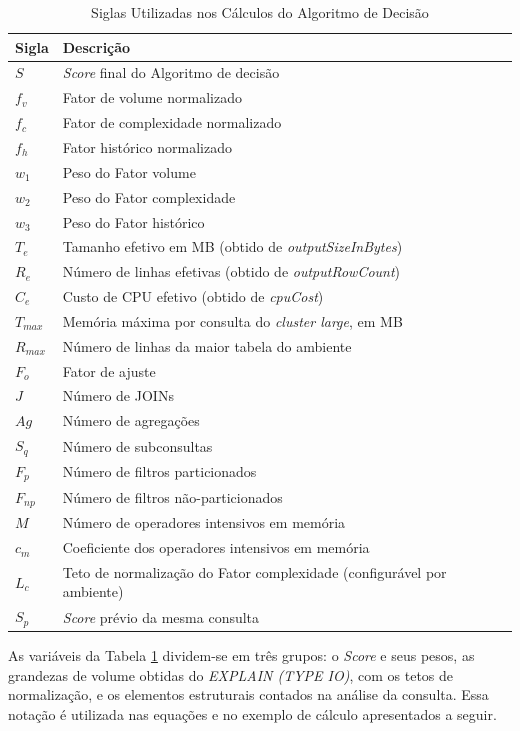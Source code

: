 \begin{table}[H]
	\centering
	\caption{Siglas Utilizadas nos Cálculos do Algoritmo de Decisão}
	\label{tab:siglas-calculo}
	\begin{tabular}{ll}
	\hline
	\textbf{Sigla} & \textbf{Descrição} \\
	\hline
	$S$ & \textit{Score} final do Algoritmo de decisão \\
	$f_v$ & Fator de volume normalizado \\
	$f_c$ & Fator de complexidade normalizado \\
	$f_h$ & Fator histórico normalizado \\
	$w_1$ & Peso do Fator volume \\
	$w_2$ & Peso do Fator complexidade \\
	$w_3$ & Peso do Fator histórico \\
	$T_e$ & Tamanho efetivo em MB (obtido de \textit{outputSizeInBytes}) \\
	$R_e$ & Número de linhas efetivas (obtido de \textit{outputRowCount}) \\
	$C_e$ & Custo de CPU efetivo (obtido de \textit{cpuCost}) \\
	$T_{max}$ & Memória máxima por consulta do \textit{cluster large}, em MB \\
	$R_{max}$ & Número de linhas da maior tabela do ambiente \\
	$F_o$ & Fator de ajuste \\
	$J$ & Número de JOINs \\
	$Ag$ & Número de agregações \\
	$S_q$ & Número de subconsultas \\
	$F_p$ & Número de filtros particionados \\
	$F_{np}$ & Número de filtros não-particionados \\
	$M$ & Número de operadores intensivos em memória \\
	$c_m$ & Coeficiente dos operadores intensivos em memória \\
	$L_c$ & Teto de normalização do Fator complexidade (configurável por ambiente) \\
	$S_p$ & \textit{Score} prévio da mesma consulta \\
	\hline
	\end{tabular}
\end{table}

As variáveis da Tabela \ref{tab:siglas-calculo} dividem-se em três grupos: o \textit{Score} e seus pesos, as grandezas de volume obtidas do \textit{EXPLAIN (TYPE IO)}, com os tetos de normalização, e os elementos estruturais contados na análise da consulta. Essa notação é utilizada nas equações e no exemplo de cálculo apresentados a seguir.

